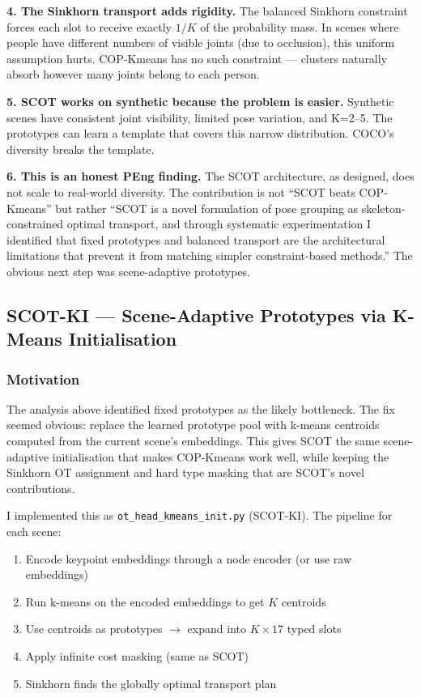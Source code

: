\textbf{4. The Sinkhorn transport adds rigidity.} The balanced Sinkhorn constraint forces each slot to receive exactly $1/K$ of the probability mass. In scenes where people have different numbers of visible joints (due to occlusion), this uniform assumption hurts. COP-Kmeans has no such constraint --- clusters naturally absorb however many joints belong to each person.

\textbf{5. SCOT works on synthetic because the problem is easier.} Synthetic scenes have consistent joint visibility, limited pose variation, and K=2--5. The prototypes can learn a template that covers this narrow distribution. COCO's diversity breaks the template.

\textbf{6. This is an honest PEng finding.} The SCOT architecture, as designed, does not scale to real-world diversity. The contribution is not ``SCOT beats COP-Kmeans'' but rather ``SCOT is a novel formulation of pose grouping as skeleton-constrained optimal transport, and through systematic experimentation I identified that fixed prototypes and balanced transport are the architectural limitations that prevent it from matching simpler constraint-based methods.'' The obvious next step was scene-adaptive prototypes.


\subsection{SCOT-KI --- Scene-Adaptive Prototypes via K-Means Initialisation}

\subsubsection{Motivation}

The analysis above identified fixed prototypes as the likely bottleneck. The fix seemed obvious: replace the learned prototype pool with k-means centroids computed from the current scene's embeddings. This gives SCOT the same scene-adaptive initialisation that makes COP-Kmeans work well, while keeping the Sinkhorn OT assignment and hard type masking that are SCOT's novel contributions.

I implemented this as \texttt{ot\_head\_kmeans\_init.py} (SCOT-KI). The pipeline for each scene:
\begin{enumerate}
    \item Encode keypoint embeddings through a node encoder (or use raw embeddings)
    \item Run k-means on the encoded embeddings to get $K$ centroids
    \item Use centroids as prototypes $\to$ expand into $K \times 17$ typed slots
    \item Apply infinite cost masking (same as SCOT)
    \item Sinkhorn finds the globally optimal transport plan
\end{enumerate}

